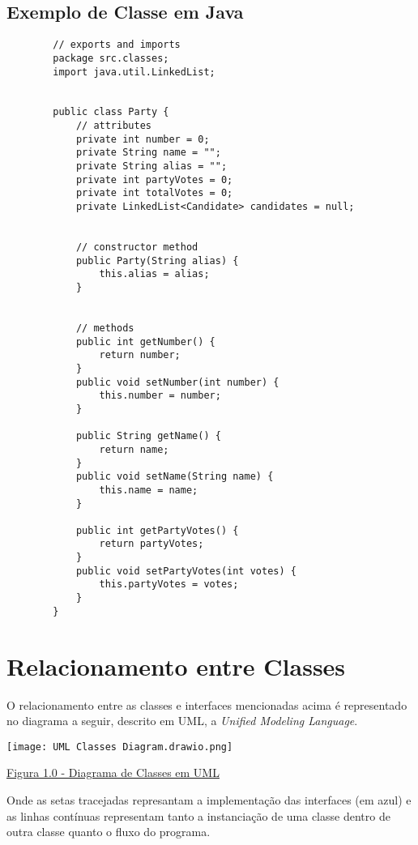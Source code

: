 \documentclass[
		12pt, %
		oneside, %
		a4paper, %
		article, %
		chapter=TITLE, %
		section=TITLE, %
		subsection=TITLE, %
		english, %
		spanish, %
		brazil %
]{abntex2} %
\numberwithin{equation}{section}
\numberwithin{figure}{section}
\numberwithin{table}{section}
\begin{document}
        \subsection{Exemplo de Classe em Java}
		\begin{verbatim}
	    // exports and imports
        package src.classes;
        import java.util.LinkedList;


        public class Party {
        	// attributes
        	private int number = 0;
        	private String name = "";
        	private String alias = "";
        	private int partyVotes = 0;
        	private int totalVotes = 0;
        	private LinkedList<Candidate> candidates = null;


        	// constructor method
        	public Party(String alias) {
        		this.alias = alias;
        	}


        	// methods
        	public int getNumber() {
        		return number;
        	}
        	public void setNumber(int number) {
        		this.number = number;
        	}

        	public String getName() {
        		return name;
        	}
        	public void setName(String name) {
        		this.name = name;
        	}

        	public int getPartyVotes() {
        		return partyVotes;
        	}
        	public void setPartyVotes(int votes) {
        		this.partyVotes = votes;
        	}
        }
		\end{verbatim}

    \newpage

	\section{Relacionamento entre Classes}

        O relacionamento entre as classes e interfaces mencionadas acima é representado no diagrama a seguir, descrito em UML, a \emph{Unified Modeling Language}.
    	\\

    	\centerline{
    	    \texttt{[image: UML Classes Diagram.drawio.png]}
    	}
		\centerline{
    		\href{https://github.com/AlvaroDavi5/Brazilian_Electoral_System/blob/dev/docs/img/UM_ Classes_Diagram.png}{Figura 1.0 - Diagrama de Classes em UML}
    	}

        Onde as setas tracejadas represantam a implementação das interfaces (em azul) e as linhas contínuas representam tanto a instanciação de uma classe dentro de outra classe quanto o fluxo do programa.
\end{document}

